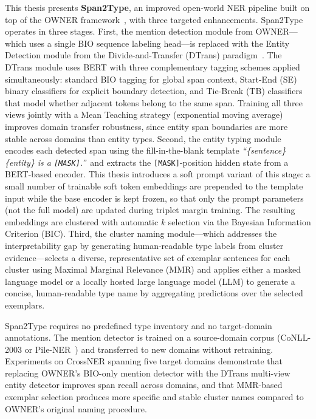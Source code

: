 \documentclass[14pt]{extreport}
\begin{document}
This thesis presents \textbf{Span2Type}, an improved open-world NER pipeline built on top of the OWNER framework~\cite{wang-etal-2023-crossner}, with three targeted enhancements. Span2Type operates in three stages. First, the mention detection module from OWNER---which uses a single BIO sequence labeling head---is replaced with the Entity Detection module from the Divide-and-Transfer (DTrans) paradigm~\cite{zhang-etal-2024-dtrans}. The DTrans module uses BERT with three complementary tagging schemes applied simultaneously: standard BIO tagging for global span context, Start-End (SE) binary classifiers for explicit boundary detection, and Tie-Break (TB) classifiers that model whether adjacent tokens belong to the same span. Training all three views jointly with a Mean Teaching strategy (exponential moving average) improves domain transfer robustness, since entity span boundaries are more stable across domains than entity types. Second, the entity typing module encodes each detected span using the fill-in-the-blank template \emph{``\{sentence\} \{entity\} is a \texttt{[MASK]}.''}\ and extracts the \texttt{[MASK]}-position hidden state from a BERT-based encoder. This thesis introduces a soft prompt variant of this stage: a small number of trainable soft token embeddings are prepended to the template input while the base encoder is kept frozen, so that only the prompt parameters (not the full model) are updated during triplet margin training. The resulting embeddings are clustered with automatic $k$ selection via the Bayesian Information Criterion (BIC). Third, the cluster naming module---which addresses the interpretability gap by generating human-readable type labels from cluster evidence---selects a diverse, representative set of exemplar sentences for each cluster using Maximal Marginal Relevance (MMR) and applies either a masked language model or a locally hosted large language model (LLM) to generate a concise, human-readable type name by aggregating predictions over the selected exemplars.

Span2Type requires no predefined type inventory and no target-domain annotations. The mention detector is trained on a source-domain corpus (CoNLL-2003 or Pile-NER~\cite{zhou-etal-2024-universalner}) and transferred to new domains without retraining. Experiments on CrossNER spanning five target domains demonstrate that replacing OWNER's BIO-only mention detector with the DTrans multi-view entity detector improves span recall across domains, and that MMR-based exemplar selection produces more specific and stable cluster names compared to OWNER's original naming procedure.
\end{document}

